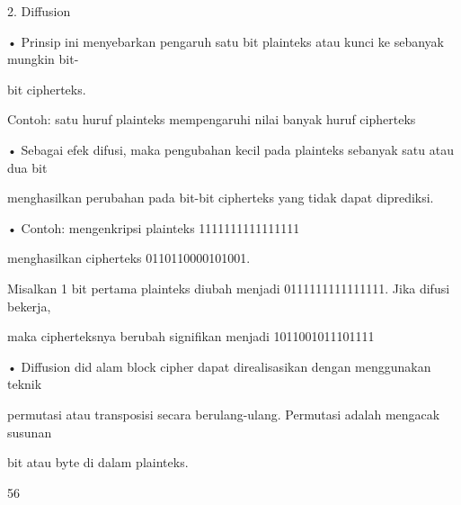 \documentclass{article}
\begin{document}

2. Diffusion

• Prinsip ini menyebarkan pengaruh satu bit plainteks atau kunci ke sebanyak mungkin bit-

bit cipherteks. 

    Contoh: satu huruf plainteks mempengaruhi nilai banyak huruf cipherteks


• Sebagai efek difusi, maka pengubahan kecil pada plainteks sebanyak satu atau dua bit 

menghasilkan perubahan pada bit-bit cipherteks yang tidak dapat diprediksi. 

• Contoh: mengenkripsi plainteks 1111111111111111 

    menghasilkan cipherteks 0110110000101001. 

    Misalkan 1 bit pertama plainteks diubah menjadi 0111111111111111. Jika difusi bekerja, 

maka cipherteksnya berubah signifikan menjadi  1011001011101111

• Diffusion did alam block cipher dapat direalisasikan dengan menggunakan teknik 

permutasi atau transposisi secara berulang-ulang. Permutasi adalah mengacak susunan 

bit atau byte di dalam plainteks.

56
\end{document}

